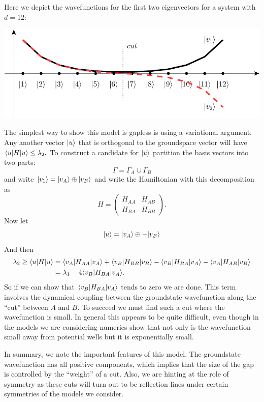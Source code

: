\documentclass[12pt]{article}
\begin{document}
Here we depict the wavefunctions for
the first two eigenvectors for a system with $d=12:$
\begin{center}
\includegraphics[]{pic-dwell.pdf}
\end{center}
The simplest way to show this model
is gapless is using a variational
argument.
Any another vector $|{u}\rangle$
that is orthogonal to the groundspace
vector will have $\langle{u}|H|{u}\rangle \le \lambda_2.$
To construct a candidate for $|{u}\rangle$
partition the
basis vectors into two parts:
$$
    \Gamma = \Gamma_A \cup \Gamma_B
$$
and write $|{v_1}\rangle = 
|{v_A}\rangle\oplus|{v_B}\rangle$
and write the Hamiltonian with this
decomposition as
$$
H = 
\left(\begin{array}{ll}
H_{AA} & H_{AB} \\
H_{BA} & H_{BB}
\end{array}\right).
$$
Now let
$$
    |{u}\rangle = |{v_A}\rangle \oplus -|{v_B}\rangle
$$
And then
\begin{align*}
    \lambda_2 \ge \langle{u}|H|{u}\rangle &= 
\langle{v_A}|H_{AA}|{v_A}\rangle +
\langle{v_B}|H_{BB}|{v_B}\rangle -
\langle{v_B}|H_{BA}|{v_A}\rangle -
\langle{v_A}|H_{AB}|{v_B}\rangle \\
    &= \lambda_1 - 4 \langle{v_B}|H_{BA}|{v_A}\rangle.
\end{align*}
So if we can show that 
$ \langle{v_B}|H_{BA}|{v_A}\rangle$
tends to zero we are done.
This term involves the 
dynamical coupling between the
groundstate wavefunction along
the ``cut'' between $A$ and $B$.
To succeed we must find such a cut where
the wavefunction is small. In general
this appears to be quite difficult,
even though in the models we are considering
numerics show that not only is the
wavefunction small away from potential wells
but it is exponentially small.

In summary, we note the important
features of this model.
The groundstate wavefunction has all
positive components, which implies
that the size of the gap is controlled
by the ``weight'' of a cut.
Also, we are hinting at the role
of symmetry as these cuts will
turn out to be reflection lines
under certain symmetries of the models
we consider.
\end{document}
